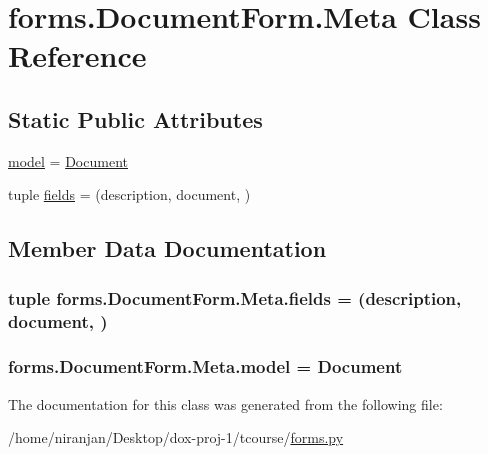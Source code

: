 \hypertarget{classforms_1_1_document_form_1_1_meta}{}\section{forms.\+Document\+Form.\+Meta Class Reference}
\label{classforms_1_1_document_form_1_1_meta}
\subsection*{Static Public Attributes}
\begin{DoxyCompactItemize}
\item 
\hyperlink{classforms_1_1_document_form_1_1_meta_a9dc62b46bc587354409b874dc7facf9a}{model} = \hyperlink{classmodels_1_1_document}{Document}
\item 
tuple \hyperlink{classforms_1_1_document_form_1_1_meta_ae4b088c56c20935354a3f520d3c7f55c}{fields} = (\textquotesingle{}description\textquotesingle{}, \textquotesingle{}document\textquotesingle{}, )
\end{DoxyCompactItemize}


\subsection{Member Data Documentation}
\subsubsection[{\texorpdfstring{fields}{fields}}]{\setlength{\rightskip}{0pt plus 5cm}tuple forms.\+Document\+Form.\+Meta.\+fields = (\textquotesingle{}description\textquotesingle{}, \textquotesingle{}document\textquotesingle{}, )\hspace{0.3cm}{\ttfamily [static]}}\hypertarget{classforms_1_1_document_form_1_1_meta_ae4b088c56c20935354a3f520d3c7f55c}{}\label{classforms_1_1_document_form_1_1_meta_ae4b088c56c20935354a3f520d3c7f55c}
\subsubsection[{\texorpdfstring{model}{model}}]{\setlength{\rightskip}{0pt plus 5cm}forms.\+Document\+Form.\+Meta.\+model = {\bf Document}\hspace{0.3cm}{\ttfamily [static]}}\hypertarget{classforms_1_1_document_form_1_1_meta_a9dc62b46bc587354409b874dc7facf9a}{}\label{classforms_1_1_document_form_1_1_meta_a9dc62b46bc587354409b874dc7facf9a}


The documentation for this class was generated from the following file\+:\begin{DoxyCompactItemize}
\item 
/home/niranjan/\+Desktop/dox-\/proj-\/1/tcourse/\hyperlink{forms_8py}{forms.\+py}\end{DoxyCompactItemize}
